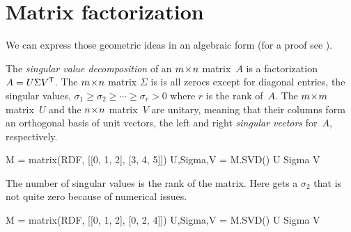 \section{Matrix factorization}

We can express those geometric ideas in an algebraic form
(for a proof see \cite{TrefethenBau97}).

The \textit{singular value decomposition} of an $m \! \times \! n$ matrix~$A$
is a factorization $A=U\Sigma {{V}^{\textsf{T}}}$.
The $m \! \times \! n$ matrix $\Sigma$ is 
is all zeroes except for diagonal entries, the singular values, 
$\sigma_1\geq \sigma_2 \geq \cdots \geq \sigma_r> 0$ where $r$ is the
rank of~$A$.
The $m \! \times \! m$ matrix~$U$ and the $n \! \times \! n$ matrix~$V$ are unitary, meaning
that their columns form an orthogonal basis of unit vectors, the left and 
right \textit{singular vectors} for~$A$, respectively. 
\begin{sageoutput}
M = matrix(RDF, [[0, 1, 2], [3, 4, 5]])
U,Sigma,V = M.SVD()
U
Sigma
V  
\end{sageoutput}
The number of singular values is the rank of the matrix.
Here \Sage{} gets a $\sigma_2$ that is not quite zero because of numerical 
issues. 
\begin{sageoutput}
M = matrix(RDF, [[0, 1, 2], [0, 2, 4]])
U,Sigma,V = M.SVD()
U
Sigma
V  
\end{sageoutput}

